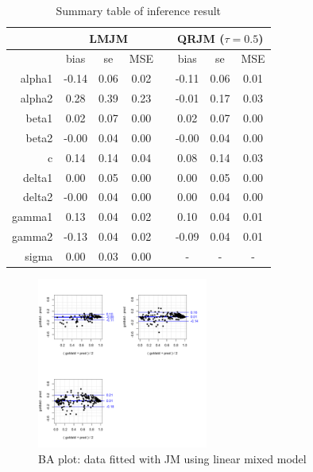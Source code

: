 \documentclass{article}
\begin{document}
\begin{table}[H]
\centering
\caption{Summary table of inference result}
\begin{tabular}{rccccccc}
\hline
& \multicolumn{3}{c}{LMJM} & & \multicolumn{3}{c}{QRJM ($\tau=0.5$)}\\
\hline
 & bias & se & MSE & & bias & se & MSE \\
 \cline{2-4}  \cline{6-8}
alpha1 & -0.14 & 0.06 & 0.02 & & -0.11 & 0.06 & 0.01 \\
  alpha2 & 0.28 & 0.39 & 0.23 & & -0.01 & 0.17 & 0.03 \\
  beta1 & 0.02 & 0.07 & 0.00 & & 0.02 & 0.07 & 0.00 \\
  beta2 & -0.00 & 0.04 & 0.00 & & -0.00 & 0.04 & 0.00 \\
  c & 0.14 & 0.14 & 0.04 & & 0.08 & 0.14 & 0.03 \\
  delta1 & 0.00 & 0.05 & 0.00 & & 0.00 & 0.05 & 0.00 \\
  delta2 & -0.00 & 0.04 & 0.00 & & 0.00 & 0.04 & 0.00 \\
  gamma1 & 0.13 & 0.04 & 0.02 & & 0.10 & 0.04 & 0.01 \\
  gamma2 & -0.13 & 0.04 & 0.02 & & -0.09 & 0.04 & 0.01 \\
  sigma & 0.00 & 0.03 & 0.00 & & - & - & -\\
   \hline
\end{tabular}
\end{table}



\begin{figure}[H]
\centering
\includegraphics[width=0.5\textwidth]{ba_LMJM_normaldata.pdf}
\caption{BA plot: data fitted with JM using linear mixed model}
\end{figure}
\end{document}
